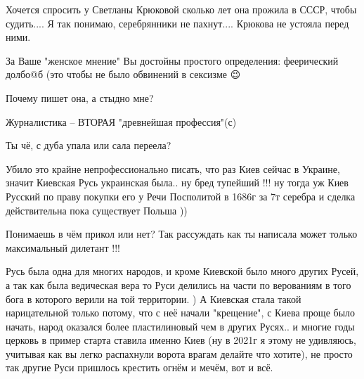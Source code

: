 \begin{itemize}
Хочется спросить у Светланы Крюковой сколько лет она прожила в СССР, чтобы
судить....  Я так понимаю, серебрянники не пахнут.... Крюкова не устояла перед
ними.

 
За Ваше "женское мнение" Вы достойны простого определения: феерический долбо@б (это чтобы не было обвинений в сексизме 😉

 
Почему пишет она, а стыдно мне?

 
Журналистика – ВТОРАЯ "древнейшая профессия"(с) \Smiley[1.0][yellow]

 

Ты чё, с дуба упала или сала переела?

Убило это крайне непрофессионально писать, что раз Киев сейчас в Украине,
значит Киевская Русь украинская была.. ну бред тупейший !!! ну тогда уж Киев
Русский по праву покупки его у Речи Посполитой в 1686г за 7т серебра и сделка
действительна пока существует Польша ))

Понимаешь в чём прикол или нет? Так рассуждать как ты написала может только максимальный дилетант !!!

Русь была одна для многих народов, и кроме Киевской было много других Русей, а
так как была ведическая вера то Руси делились на части по верованиям в того
бога в которого верили на той территории. ) А Киевская стала такой
нарицательной только потому, что с неё начали "крещение", с Киева проще было
начать, народ оказался более пластилиновый чем в других Русях.. и многие годы
церковь в пример старта ставила именно Киев (ну в 2021г я этому не удивляюсь,
учитывая как вы легко распахнули ворота врагам делайте что хотите), не просто
так другие Руси пришлось крестить огнём и мечём, вот и всё.


\end{itemize}
